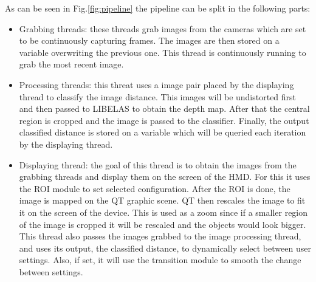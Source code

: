 \documentclass[10pt,a4paper,twocolumn,twoside]{article}
\begin{document}
	As can be seen in Fig.\ref{fig:pipeline} the pipeline can be split in the following parts: 
	
	\begin{itemize}
		\item Grabbing threads: these threads grab images from the cameras which are set to be continuously capturing frames. The images are then stored on a variable overwriting the previous one. This thread is continuously running to grab the most recent image.
		
		\item Processing threads: this threat uses a image pair placed by the displaying thread to classify the image distance. This images will be undistorted first and then passed to LIBELAS to obtain the depth map. After that the central region is cropped and the image is passed to the classifier. Finally, the output classified distance is stored on a variable which will be queried each iteration by the displaying thread.  
		
		\item Displaying thread: the goal of this thread is to obtain the images from the grabbing threads and display them on the screen of the HMD. For this it uses the ROI module to set selected configuration. After the ROI is done, the image is mapped on the QT graphic scene. QT then rescales the image to fit it on the screen of the device. This is used as a zoom since if a smaller region of the image is cropped it will be rescaled and the objects would look bigger. This thread also passes the images grabbed to the image processing thread, and uses its output, the classified distance, to dynamically select between user settings. Also, if set, it will use the transition module to smooth the change between settings. 
	\end{itemize}
	
\end{document}
